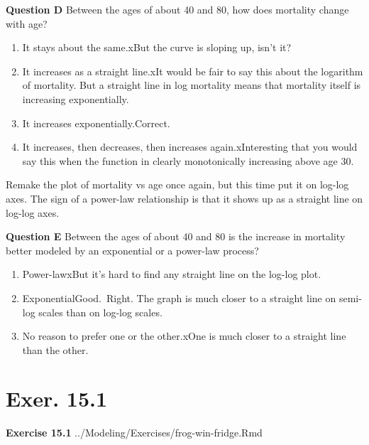 \documentclass[
  letterpaper,
  DIV=11,
  numbers=noendperiod,
  oneside]{article}
\providecommand{\tightlist}{%
  \setlength{\itemsep}{0pt}\setlength{\parskip}{0pt}}\usepackage{longtable,booktabs,array}
\begin{document}
\begin{multicols}{2}
\textbf{Question D} Between the ages of about 40 and 80, how does
mortality change with age?

\begin{enumerate}
\def\labelenumi{\roman{enumi}.}
\tightlist
\item
  {It stays about the same.{xBut the curve is sloping up, isn't
  it?}}\\
\item
  {It increases as a straight line.{xIt would be fair to say this
  about the logarithm of mortality. But a straight line in log mortality
  means that mortality itself is increasing exponentially.}}\\
\item
  {It increases exponentially.{Correct.~}}\\
\item
  {It increases, then decreases, then increases again.{xInteresting
  that you would say this when the function in clearly monotonically
  increasing above age 30.}}
\end{enumerate}

Remake the plot of mortality vs age once again, but this time put it on
log-log axes. The sign of a power-law relationship is that it shows up
as a straight line on log-log axes.

\textbf{Question E} Between the ages of about 40 and 80 is the increase
in mortality better modeled by an exponential or a power-law process?

\begin{enumerate}
\def\labelenumi{\roman{enumi}.}
\tightlist
\item
  {Power-law{xBut it's hard to find any straight line on the log-log
  plot.}}\\
\item
  {Exponential{Good.~Right. The graph is much closer to a straight line
  on semi-log scales than on log-log scales.}}\\
\item
  {No reason to prefer one or the other.{xOne is much closer to a
  straight line than the other.}}
\end{enumerate}

\hypertarget{exer.-15.1}{%
\section*{Exer. 15.1}\label{exer.-15.1}}

\textbf{Exercise 15.1} ../Modeling/Exercises/frog-win-fridge.Rmd


\end{multicols}
\end{document}

